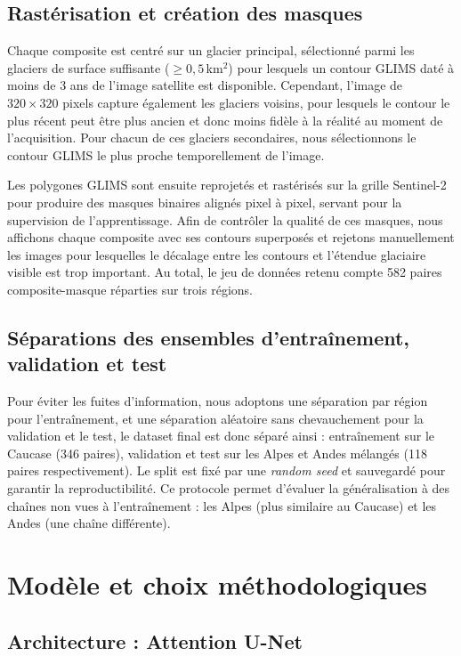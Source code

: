 \documentclass[11pt]{article}
\begin{document}
 
\subsection{Rastérisation et création des masques}
Chaque composite est centré sur un glacier principal, sélectionné
parmi les glaciers de surface suffisante ($ \geq 0{,}5$\,km$^2$)
pour lesquels un contour GLIMS daté à moins de 3 ans de l'image
satellite est disponible. Cependant, l'image de $320 \times 320$
pixels capture également les glaciers voisins, pour lesquels le
contour le plus récent peut être plus ancien et donc moins fidèle
à la réalité au moment de l'acquisition. Pour chacun de ces glaciers
secondaires, nous sélectionnons le contour GLIMS le plus proche
temporellement de l'image.

Les polygones GLIMS sont ensuite reprojetés et rastérisés sur la
grille Sentinel-2 pour produire des masques binaires alignés pixel
à pixel, servant pour la supervision de l'apprentissage. Afin de
contrôler la qualité de ces masques, nous affichons chaque composite
avec ses contours superposés et rejetons manuellement les images
pour lesquelles le décalage entre les contours et l'étendue glaciaire
visible est trop important. Au total, le jeu de données retenu compte
582 paires composite-masque réparties sur trois régions.

\subsection{Séparations des ensembles d'entraînement, validation et test}
Pour éviter les fuites d'information, nous adoptons une séparation
par région pour l'entraînement, et une séparation aléatoire sans
chevauchement pour la validation et le test, le dataset final est donc séparé ainsi : entraînement sur le Caucase (346 paires), validation et test sur les Alpes et Andes mélangés (118 paires respectivement). Le split est fixé par une \emph{random seed} et sauvegardé
pour garantir la reproductibilité. Ce protocole permet d'évaluer la
généralisation à des chaînes non vues à l'entraînement : les Alpes
(plus similaire au Caucase) et les Andes (une chaîne différente).

\section{Modèle et choix méthodologiques}

\subsection{Architecture : Attention U-Net}
\end{document}
